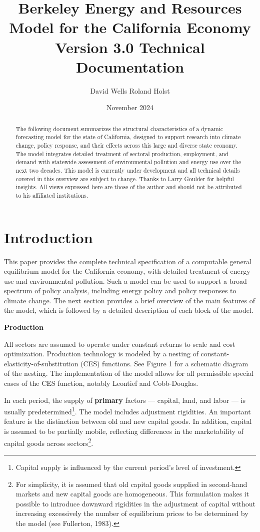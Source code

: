 \documentclass{article}
\title{Berkeley Energy and Resources Model for the California Economy Version 3.0 Technical Documentation}
\author{David Wells Roland Holst}
\date{November 2024}
\begin{document}
\maketitle


\newpage
\renewcommand{\abstractname}{\underline{\large Abstract}}
\begin{abstract}
The following document summarizes the structural characteristics of a dynamic forecasting model for the state of California, designed to support research into climate change, policy response, and their effects across this large and diverse state economy. The model integrates detailed treatment of sectoral production, employment, and demand with statewide assessment of environmental pollution and energy use over the next two decades. This model is currently under development and all technical details covered in this overview are subject to change. Thanks to Larry Goulder for helpful insights. All views expressed here are those of the author and should not be attributed to his affiliated institutions.
\end{abstract}

\newpage
\tableofcontents

\newpage
\section{Introduction}
This paper provides the complete technical specification of a computable general equilibrium model for the California economy, with detailed treatment of energy use and environmental pollution. Such a model can be used to support a broad spectrum of policy analysis, including energy policy and policy responses to climate change. The next section provides a brief overview of the main features of the model, which is followed by a detailed description of each block of the model.

\textbf{Production}

All sectors are assumed to operate under constant returns to scale and cost optimization. Production technology is modeled by a nesting of constant-elasticity-of-substitution (CES) functions. See Figure 1 for a schematic diagram of the nesting. The implementation of the model allows for all permissible special cases of the CES function, notably Leontief and Cobb-Douglas.

In each period, the supply of \textbf{primary} factors — capital, land, and labor — is usually predetermined\footnote{Capital supply is influenced by the current period’s level of investment.}. The model includes adjustment rigidities. An important feature is the distinction between old and new capital goods. In addition, capital is assumed to be partially mobile, reflecting differences in the marketability of capital goods across sectors\footnote{For simplicity, it is assumed that old capital goods supplied in second-hand markets and new capital goods are homogeneous. This formulation makes it possible to introduce downward rigidities in the adjustment of capital without increasing excessively the number of equilibrium prices to be determined by the model (see Fullerton, 1983).}.
\end{document}
